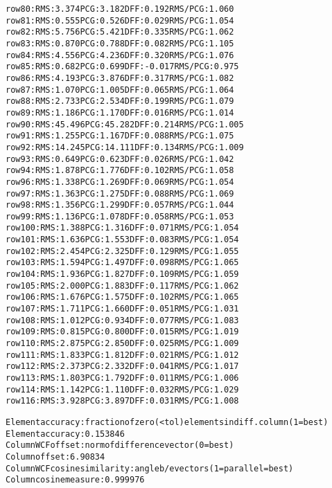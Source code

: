 \begin{alltt}
row  80:  RMS:   3.374    PCG:   3.182    DFF:   0.192    RMS/PCG:   1.060    
row  81:  RMS:   0.555    PCG:   0.526    DFF:   0.029    RMS/PCG:   1.054    
row  82:  RMS:   5.756    PCG:   5.421    DFF:   0.335    RMS/PCG:   1.062    
row  83:  RMS:   0.870    PCG:   0.788    DFF:   0.082    RMS/PCG:   1.105    
row  84:  RMS:   4.556    PCG:   4.236    DFF:   0.320    RMS/PCG:   1.076    
row  85:  RMS:   0.682    PCG:   0.699    DFF:  -0.017    RMS/PCG:   0.975    
row  86:  RMS:   4.193    PCG:   3.876    DFF:   0.317    RMS/PCG:   1.082    
row  87:  RMS:   1.070    PCG:   1.005    DFF:   0.065    RMS/PCG:   1.064    
row  88:  RMS:   2.733    PCG:   2.534    DFF:   0.199    RMS/PCG:   1.079    
row  89:  RMS:   1.186    PCG:   1.170    DFF:   0.016    RMS/PCG:   1.014    
row  90:  RMS:  45.496    PCG:  45.282    DFF:   0.214    RMS/PCG:   1.005    
row  91:  RMS:   1.255    PCG:   1.167    DFF:   0.088    RMS/PCG:   1.075    
row  92:  RMS:  14.245    PCG:  14.111    DFF:   0.134    RMS/PCG:   1.009    
row  93:  RMS:   0.649    PCG:   0.623    DFF:   0.026    RMS/PCG:   1.042    
row  94:  RMS:   1.878    PCG:   1.776    DFF:   0.102    RMS/PCG:   1.058    
row  96:  RMS:   1.338    PCG:   1.269    DFF:   0.069    RMS/PCG:   1.054    
row  97:  RMS:   1.363    PCG:   1.275    DFF:   0.088    RMS/PCG:   1.069    
row  98:  RMS:   1.356    PCG:   1.299    DFF:   0.057    RMS/PCG:   1.044    
row  99:  RMS:   1.136    PCG:   1.078    DFF:   0.058    RMS/PCG:   1.053    
row 100:  RMS:   1.388    PCG:   1.316    DFF:   0.071    RMS/PCG:   1.054    
row 101:  RMS:   1.636    PCG:   1.553    DFF:   0.083    RMS/PCG:   1.054    
row 102:  RMS:   2.454    PCG:   2.325    DFF:   0.129    RMS/PCG:   1.055    
row 103:  RMS:   1.594    PCG:   1.497    DFF:   0.098    RMS/PCG:   1.065    
row 104:  RMS:   1.936    PCG:   1.827    DFF:   0.109    RMS/PCG:   1.059    
row 105:  RMS:   2.000    PCG:   1.883    DFF:   0.117    RMS/PCG:   1.062    
row 106:  RMS:   1.676    PCG:   1.575    DFF:   0.102    RMS/PCG:   1.065    
row 107:  RMS:   1.711    PCG:   1.660    DFF:   0.051    RMS/PCG:   1.031    
row 108:  RMS:   1.012    PCG:   0.934    DFF:   0.077    RMS/PCG:   1.083    
row 109:  RMS:   0.815    PCG:   0.800    DFF:   0.015    RMS/PCG:   1.019    
row 110:  RMS:   2.875    PCG:   2.850    DFF:   0.025    RMS/PCG:   1.009    
row 111:  RMS:   1.833    PCG:   1.812    DFF:   0.021    RMS/PCG:   1.012    
row 112:  RMS:   2.373    PCG:   2.332    DFF:   0.041    RMS/PCG:   1.017    
row 113:  RMS:   1.803    PCG:   1.792    DFF:   0.011    RMS/PCG:   1.006    
row 114:  RMS:   1.142    PCG:   1.110    DFF:   0.032    RMS/PCG:   1.029    
row 116:  RMS:   3.928    PCG:   3.897    DFF:   0.031    RMS/PCG:   1.008    

Element accuracy: fraction of zero (<tol) elements in diff. column (1=best)
Element accuracy:  0.153846
Column WCF offset: norm of difference vector (0=best)
Column offset:  6.90834
Column WCF cosine similarity: angle b/e vectors (1=parallel=best)
Column cosine measure:  0.999976
\end{alltt}
